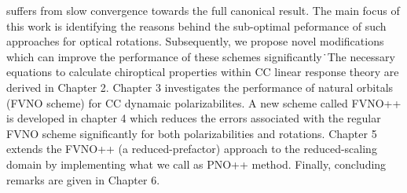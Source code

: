 suffers from slow convergence towards the full canonical result. The main focus of this work is identifying the 
reasons behind the sub-optimal peformance of such approaches for optical rotations. Subsequently, we propose novel modifications
which can improve the performance of these schemes significantly\.\
The necessary equations to calculate chiroptical properties within CC linear response theory are derived in 
Chapter 2. %
Chapter 3 investigates the performance of natural orbitals (FVNO scheme) for CC dynamaic polarizabilites.
A new scheme called FVNO++ is developed in chapter 4 which reduces the errors associated with the regular FVNO scheme
significantly for both polarizabilities and rotations. Chapter 5 extends the FVNO++ (a reduced-prefactor) approach to the reduced-scaling 
domain by implementing what we call as PNO++ method. Finally, concluding remarks are given in Chapter 6.
